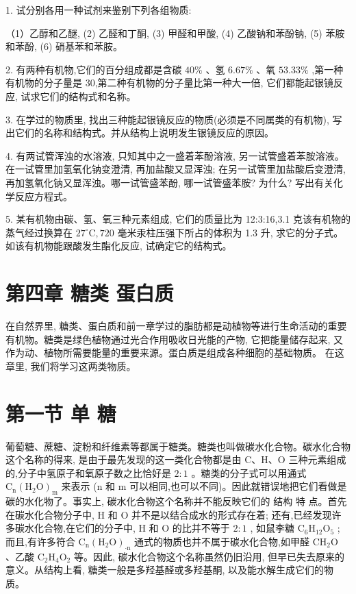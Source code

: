 \documentclass[10pt]{article}
\begin{document}
1. 试分别各用一种试剂来鉴别下列各组物质:

（1）乙醇和乙醚, (2) 乙醛和丁酮, (3) 甲醛和甲酸, (4) 乙酸钠和苯酚钠, (5) 苯胺和苯酚, (6) 硝基苯和苯胺。

2. 有两种有机物,它们的百分组成都是含碳 \({40}\%\) 、氢 \({6.67}\%\) 、氧 \({53.33}\%\) ,第一种有机物的分子量是 30,第二种有机物的分子量比第一种大一倍, 它们都能起银镜反应, 试求它们的结构式和名称。

3. 在学过的物质里, 找出三种能起银镜反应的物质(必须是不同属类的有机物), 写出它们的名称和结构式。并从结构上说明发生银镜反应的原因。

4. 有两试管浑浊的水溶液, 只知其中之一盛着苯酚溶液, 另一试管盛着苯胺溶液。在一试管里加氢氧化钠变澄清, 再加盐酸又显浑浊; 在另一试管里加盐酸后变澄清, 再加氢氧化钠又显浑浊。哪一试管盛苯酚, 哪一试管盛苯胺? 为什么? 写出有关化学反应方程式。

5. 某有机物由碳、氢、氧三种元素组成, 它们的质量比为 12:3:16,3.1 克该有机物的蒸气经过换算在 \({27}^{ \circ }\mathrm{C},{720}\) 毫米汞柱压强下所占的体积为 1.3 升, 求它的分子式。如该有机物能跟酸发生酯化反应, 试确定它的结构式。

\section*{第四章 糖类 蛋白质}

在自然界里, 糖类、蛋白质和前一章学过的脂肪都是动植物等进行生命活动的重要有机物。糖类是绿色植物通过光合作用吸收日光能的产物, 它把能量储存起来, 又作为动、植物所需要能量的重要来源。蛋白质是组成各种细胞的基础物质。 在这章里, 我们将学习这两类物质。

\section*{第一节 单 糖}

葡萄糖、蔗糖、淀粉和纤维素等都属于糖类。糖类也叫做碳水化合物。碳水化合物这个名称的得来, 是由于最先发现的这一类化合物都是由 \(\mathrm{C}\text{、}\mathrm{H}\text{、}\mathrm{O}\) 三种元素组成的,分子中氢原子和氧原子数之比恰好是 \(2 : 1\) 。糖类的分子式可以用通式 \({\mathrm{C}}_{\mathrm{n}}{\left( {\mathrm{H}}_{2}\mathrm{O}\right) }_{\mathrm{m}}\) 来表示 (n 和 \(\mathrm{m}\) 可以相同,也可以不同)。因此就错误地把它们看做是碳的水化物了。事实上, 碳水化合物这个名称并不能反映它们的 结构 特 点。首先在碳水化合物分子中, \(\mathrm{H}\) 和 \(\mathrm{O}\) 并不是以结合成水的形式存在着; 还有,已经发现许多碳水化合物,在它们的分子中, \(\mathrm{H}\) 和 \(\mathrm{O}\) 的比并不等于 \(2 : 1\) , 如鼠李糖 \({\mathrm{C}}_{6}{\mathrm{H}}_{12}{\mathrm{O}}_{5}\) ; 而且,有许多符合 \({\mathrm{C}}_{\mathrm{n}}{\left( {\mathrm{H}}_{2}\mathrm{O}\right) }_{\cdot \mathrm{n}}\) 通式的物质也并不属于碳水化合物,如甲醛 \({\mathrm{{CH}}}_{2}\mathrm{O}\) 、乙酸 \({\mathrm{C}}_{2}{\mathrm{H}}_{4}{\mathrm{O}}_{2}\) 等。因此, 碳水化合物这个名称虽然仍旧沿用, 但早已失去原来的意义。从结构上看, 糖类一般是多羟基醛或多羟基酮, 以及能水解生成它们的物质。
\end{document}
